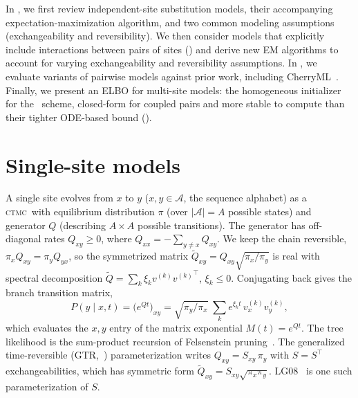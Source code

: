 \documentclass{article}
\newcommand{\CTMC}{\textsc{ctmc}}
\newcommand{\Xset}{\mathcal{A}}
\begin{document}
In , we first review independent-site substitution models, their accompanying expectation-maximization algorithm, and two common modeling assumptions (exchangeability and reversibility).
We then consider models that explicitly include interactions between pairs of sites () and derive new EM algorithms to account for varying exchangeability and reversibility assumptions. 
In , we evaluate variants of pairwise models against prior work, including CherryML~\cite{Prillo2023CherryML}. 
Finally, we present an ELBO for multi-site models: the homogeneous initializer for the~\citet{cohn2010} scheme, closed-form for coupled pairs and more stable to compute than their tighter ODE-based bound ().

\section{Single-site models}
\label{sec:single}
A single site evolves from $x$ to $y$ ($x,y \in \Xset$, the sequence alphabet) as a \CTMC\ with equilibrium distribution $\pi$ (over  $|\Xset|=A$ possible states) and generator $Q$ (describing $A \times A$ possible transitions).
The generator has off-diagonal rates $Q_{xy}\ge0$, where
$Q_{xx}=-\sum_{y\ne x}Q_{xy}$.
We keep the chain reversible, $\pi_xQ_{xy}=\pi_yQ_{yx}$, so the symmetrized matrix
$\widetilde Q_{xy}=Q_{xy}\sqrt{\pi_x/\pi_y}$ is real with
spectral decomposition $\widetilde Q=\sum_k\xi_k v^{(k)}{v^{(k)}}^\top$,
$\xi_k\le0$. Conjugating back gives the branch transition matrix,
\begin{equation}
\label{eq:pt}
P(y \mid x,t)=\big(e^{Qt}\big)_{xy}=\sqrt{\pi_y/\pi_x}\;\textstyle\sum_k
   e^{\xi_k t}\,v^{(k)}_x v^{(k)}_y,
\end{equation}
which evaluates the $x,y$ entry of the matrix exponential $M(t) = e^{Qt}$.
The tree likelihood is the sum-product recursion of Felsenstein
pruning~\cite{Felsenstein81}.
The generalized time-reversible (GTR,~\cite{tavare1986some}) parameterization writes
$Q_{xy}=S_{xy}\,\pi_y$ with $S=S^\top$ exchangeabilities, which has symmetric form
$\widetilde Q_{xy}=S_{xy}\sqrt{\pi_x\pi_y}$. LG08~\cite{LG08} is one such parameterization of $S$.
\end{document}

